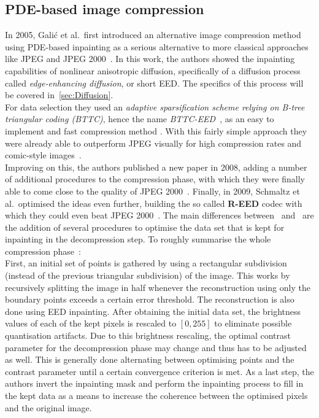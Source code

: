 \subsection{PDE-based image compression}
In 2005, Galić et al.\ first introduced an alternative image compression method using PDE-based inpainting as
a serious alternative to more classical approaches like JPEG and JPEG 2000~\cite{galic05}. In this
work, the authors showed the inpainting capabilities of nonlinear anisotropic diffusion, specifically of
a diffusion process called \textit{edge-enhancing diffusion}, or short EED.\@
The specifics of this process will be covered in~\ref{sec:Diffusion}.\\
For data selection they used an
\textit{adaptive sparsification scheme relying on B-tree triangular coding (BTTC)}, hence the name
\textit{BTTC-EED}~\cite{galic05}, as an easy to implement and fast compression method
\cite{distasi97}.
With this fairly simple approach they were already able to outperform JPEG visually for high
compression rates and comic-style images~\cite{galic05}.\\
Improving on this, the authors published a new paper in 2008, adding a number of additional
procedures to the compression phase, with which they were finally able to come close to the quality
of JPEG 2000~\cite{galic08}.
Finally, in 2009, Schmaltz et al.\ optimised the ideas even further, building the
so called \textbf{R-EED} codec with which they could even beat JPEG 2000~\cite{schmaltz09}.
The main differences between~\cite{galic05} and~\cite{schmaltz09} are the addition of several
procedures to optimise the data set that is kept for inpainting in the decompression step.
To roughly summarise the whole compression phase~\cite{schmaltz09}:\\
First, an initial set of points is gathered by using a rectangular subdivision (instead of the
previous triangular subdivision) of the image. This works by recursively splitting the image in
half whenever the reconstruction using only the boundary points exceeds a certain error threshold.
The reconstruction is also done using EED inpainting.
After obtaining the initial data set, the brightness values of each of the kept pixels is rescaled
to $[0, 255]$ to eliminate possible quantisation artifacts. Due to this brightness rescaling, the
optimal contrast parameter for the decompression phase may change and thus has to be adjusted as
well. This is generally done alternating between optimising points and the contrast
parameter until a certain convergence criterion is met.
As a last step, the authors invert the inpainting mask and perform the inpainting process to fill in
    the kept data as a means to increase the coherence between the optimised pixels and the
    original image.

